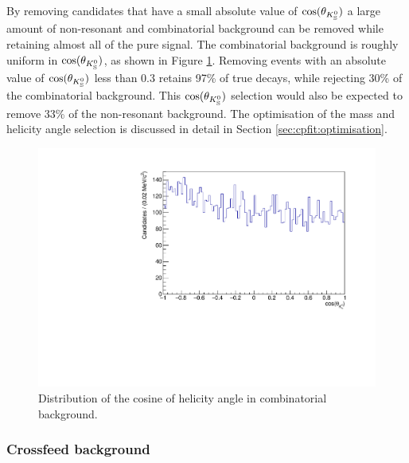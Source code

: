 By removing candidates that have a small absolute value of $\cos(\theta_{{{K}^0_{\mathrm{ \scriptscriptstyle S}}}})$ a large amount of non-resonant \decay{\Bm}{\D\KS\pim} and combinatorial background can be removed while retaining almost all of the pure \decay{\Bm}{\D\Kstarm} signal. The combinatorial background is roughly uniform in $\cos(\theta_{{{K}^0_{\mathrm{ \scriptscriptstyle S}}}})$, as shown in Figure \ref{Kshelicitybkg}. Removing events with an absolute value of $\cos(\theta_{{{K}^0_{\mathrm{ \scriptscriptstyle S}}}})$ less than 0.3 retains 97\% of true \decay{\Bm}{\D\Kstarm} decays, while rejecting 30\% of the combinatorial background. This $\cos(\theta_{{{K}^0_{\mathrm{ \scriptscriptstyle S}}}})$ selection would also be expected to remove 33\% of the non-resonant \decay{\Bm}{\D\KS\pim} background. The optimisation of the \Kstarm mass and \KS helicity angle selection is discussed in detail in Section \ref{sec:cpfit:optimisation}.

\begin{figure}
\centering
\includegraphics[width=0.5\linewidth]{figures/backgrounds/Kshelicity_background.pdf}
\caption{Distribution of the cosine of \KS helicity angle in \kpi combinatorial background.}
\label{Kshelicitybkg}
\end{figure}

\subsubsection{Crossfeed background}
\label{sec:backgrounds:crossfeed}

